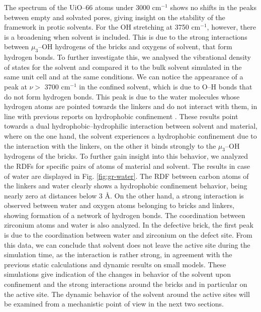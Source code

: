 The spectrum of the UiO--66 atoms under 3000 cm$^{-1}$ shows no shifts in the peaks between empty and solvated pores, giving insight on the stability of the framework in protic solvents. For the OH stretching at 3750 cm$^{-1}$, however, there is a broadening when solvent is included. This is due to the strong interactions between $\mu_3$--OH hydrogens of the bricks and oxygens of solvent, that form hydrogen bonds. To further investigate this, we analysed the vibrational density of states for the solvent and compared it to the bulk solvent simulated in the same unit cell and at the same conditions. We can notice the appearance of a peak at $\nu >$ 3700 cm$^{-1}$ in the confined solvent, which is due to O--H bonds that do not form hydrogen bonds. This peak is due to the water molecules whose hydrogen atoms are pointed towards the linkers and do not interact with them, in line with previous reports on hydrophobic confinement \cite{coudert2006dipole, dalla2016water, cicero2008water}. 
\npar
These results point towards a dual hydrophobic--hydrophilic interaction between solvent and material, where on the one hand, the solvent experiences a hydrophobic confinement due to the interaction with the linkers, on the other it binds strongly to the $\mu_3$--OH hydrogens of the bricks. To further gain insight into this behavior, we analyzed the RDFs for specific pairs of atoms of material and solvent. The results in case of water are displayed in Fig. \ref{fig:gr-water}. The RDF between carbon atoms of the linkers and water clearly shows a hydrophobic confinement behavior, being nearly zero at distances below 3 \AA. On the other hand, a strong interaction is observed between water and oxygen atoms belonging to bricks and linkers, showing formation of a network of hydrogen bonds. The coordination between zirconium atoms and water is also analyzed. In the defective brick, the first peak is due to the coordination between water and zirconium on the defect site. 
\npar
From this data, we can conclude that solvent does not leave the active site during the simulation time, as the interaction is rather strong, in agreement with the previous static calculations and dynamic results on small models. These simulations give indication of the changes in behavior of the solvent upon confinement and the strong interactions around the bricks and in particular on the active site. The dynamic behavior of the solvent around the active sites will be examined from a mechanistic point of view in the next two sections.

